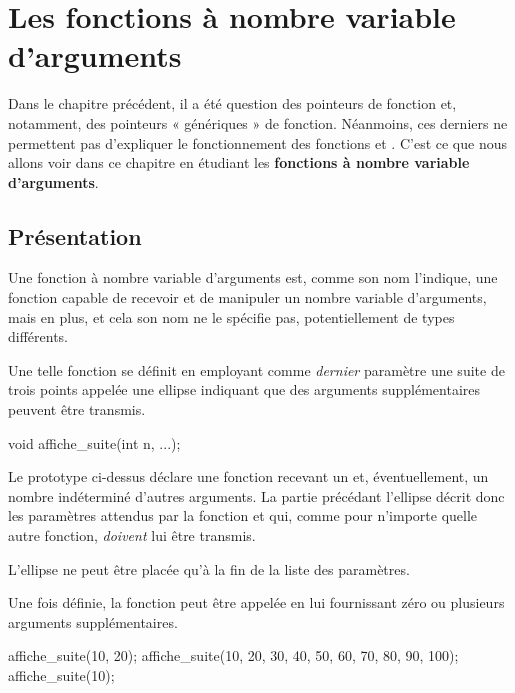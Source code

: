 \chapter{Les fonctions à nombre variable d'arguments}
\label{les-fonctions-a-nombre-variable-darguments}
  
  Dans le chapitre précédent, il a été question des pointeurs de fonction et,
  notamment, des pointeurs « génériques » de fonction. Néanmoins, ces
  derniers ne permettent pas d'expliquer le fonctionnement des fonctions
   et . C'est ce que nous allons voir
  dans ce chapitre en étudiant les \textbf{fonctions à nombre variable
  d'arguments}.

\section{Présentation}
\label{presentation-2}

Une fonction à nombre variable d'arguments est, comme son nom l'indique,
une fonction capable de recevoir et de manipuler un nombre variable
d'arguments, mais en plus, et cela son nom ne le spécifie pas,
potentiellement de types différents.

Une telle fonction se définit en employant comme \emph{dernier}
paramètre une suite de trois points appelée une ellipse indiquant que
des arguments supplémentaires peuvent être transmis.

\begin{C}
void affiche_suite(int n, ...);
\end{C}

Le prototype ci-dessus déclare une fonction recevant un  et,
éventuellement, un nombre indéterminé d'autres arguments. La partie
précédant l'ellipse décrit donc les paramètres attendus par la fonction
et qui, comme pour n'importe quelle autre fonction, \emph{doivent} lui
être transmis.

\begin{erreurbox}
  L'ellipse ne peut être placée qu'à la fin
de la liste des paramètres.
\end{erreurbox}


Une fois définie, la fonction peut être appelée en lui fournissant zéro
ou plusieurs arguments supplémentaires.

\begin{C}
affiche_suite(10, 20);
affiche_suite(10, 20, 30, 40, 50, 60, 70, 80, 90, 100);
affiche_suite(10);
\end{C}

